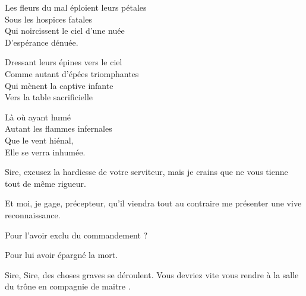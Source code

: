 \begin{drama}
  \choirspeaks
  \begin{minipage}[t]{\linewidth}
      Les fleurs du mal éploient leurs pétales\\
      Sous les hospices fatales\\
      Qui noircissent le ciel d’une nuée\\
      D’espérance dénuée.\vspace{1em}

      Dressant leurs épines vers le ciel\\
      Comme autant d’épées triomphantes\\
      Qui mènent la captive infante\\
      Vers la table sacrificielle\vspace{1em}

      Là où ayant humé\\
      Autant les flammes infernales\\
      Que le vent hiénal,\\
      Elle se verra inhumée.\\
  \end{minipage}

  \alexasspeaks Sire, excusez la hardiesse de votre serviteur, mais je crains que \general{} ne vous tienne tout de même rigueur.

  \elenaspeaks {} Et moi, je gage, précepteur, qu’il viendra tout au contraire me présenter une vive reconnaissance.

  \alexasspeaks Pour l’avoir exclu du commandement ?

  \elenaspeaks Pour lui avoir épargné la mort.



  \disciplespeaks {} Sire, Sire, des choses graves se déroulent. Vous devriez vite vous rendre à la salle du trône en compagnie de maitre \alexas.
\end{drama}

\scene


\StageDirII{\elena, \alexas, \general}

